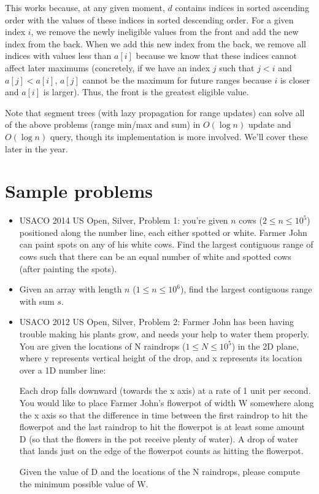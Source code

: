 \documentclass{article}
\begin{document}
This works because, at any given moment, $d$ contains indices in sorted ascending order with the values of these indices in sorted descending order. For a given index $i$, we remove the newly ineligible values from the front and add the new index from the back. When we add this new index from the back, we remove all indices with values less than $a[i]$ because we know that these indices cannot affect later maximums (concretely, if we have an index $j$ such that $j < i$ and $a[j] < a[i]$, $a[j]$ cannot be the maximum for future ranges because $i$ is closer and $a[i]$ is larger). Thus, the front is the greatest eligible value.

Note that segment trees (with lazy propagation for range updates) can solve all of the above problems (range min/max and sum) in $O(\log n)$ update and $O(\log n)$ query, though its implementation is more involved. We'll cover these later in the year.

\section{Sample problems}
\begin{itemize}
    \item USACO 2014 US Open, Silver, Problem 1: you're given $n$ cows ($2 \leq n \leq 10^5$) positioned along the number line, each either spotted or white. Farmer John can paint spots on any of his white cows. Find the largest contiguous range of cows such that there can be an equal number of white and spotted cows (after painting the spots).
    \item Given an array with length $n$ ($1 \leq n \leq 10^6$), find the largest contiguous range with sum $s$.
    \item USACO 2012 US Open, Silver, Problem 2: Farmer John has been having trouble making his plants grow, and needs your
help to water them properly.  You are given the locations of N raindrops  
($1 \leq N \leq 10^5$) in the 2D plane, where y represents vertical height of
the drop, and x represents its location over a 1D number line:  



Each drop falls downward (towards the x axis) at a rate of 1 unit per
second.  You would like to place Farmer John's flowerpot of width W
somewhere along the x axis so that the difference in time between the
first raindrop to hit the flowerpot and the last raindrop to hit the
flowerpot is at least some amount D (so that the flowers in the pot receive
plenty of water).  A drop of water that lands just on the edge of the
flowerpot counts as hitting the flowerpot.

Given the value of D and the locations of the N raindrops, please compute
the minimum possible value of W.
\end{itemize} 
\end{document}
